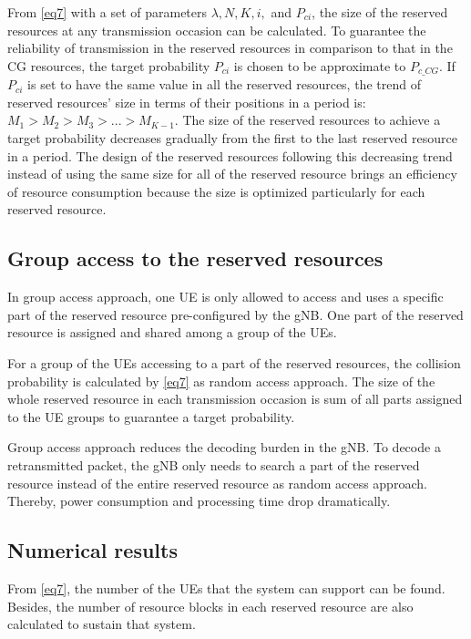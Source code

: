 \documentclass{report}
\begin{document}
From \eqref{eq7} with a set of parameters  $\lambda, N, K, i,$ and $P_{ci}$, the size of the reserved resources at any transmission occasion can be calculated. To guarantee the reliability of transmission in the reserved resources in comparison to that in the CG resources, the target probability $P_{ci}$ is chosen to be approximate to $P_{c\_CG}$. If $P_{ci}$ is set to have the same value in all the reserved resources, the trend of reserved resources' size in terms of their positions in a period is: $M_1 > M_2 > M_3 > ... > M_{K-1}$. The size of the reserved resources to achieve a target probability decreases gradually from the first to the last reserved resource in a period. The design of the reserved resources following this decreasing trend instead of using the same size for all of the reserved resource brings an efficiency of resource consumption because the size is optimized particularly for each reserved resource.

\subsection{Group access to the reserved resources}

In group access approach, one UE is only allowed to access and uses a specific part of the reserved resource pre-configured by the gNB. One part of the reserved resource is assigned and shared among a group of the UEs.

For a group of the UEs accessing to a part of the reserved resources, the collision probability is calculated by \eqref{eq7} as random access approach. The size of the whole reserved resource in each transmission occasion is sum of all parts assigned to the UE groups to guarantee a target probability. 

Group access approach reduces the decoding burden in the gNB. To decode a retransmitted packet, the gNB only needs to search a part of the reserved resource instead of the entire reserved resource as random access approach. Thereby, power consumption and processing time drop dramatically. 

\subsection{Numerical results}\label{324}

From \eqref{eq7}, the number of the UEs that the system can support can be found. Besides, the number of resource blocks in each reserved resource are also calculated to sustain that system.
\end{document}
